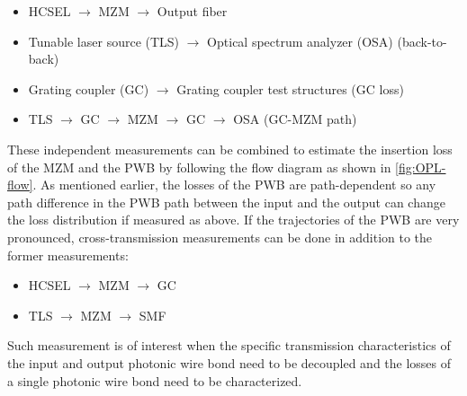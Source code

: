 \begin{itemize}
\item HCSEL $\rightarrow$ MZM $\rightarrow$ Output fiber
\item Tunable laser source (TLS) $\rightarrow$ Optical spectrum analyzer (OSA) (back-to-back)
\item Grating coupler (GC) $\rightarrow$ Grating coupler test structures (GC loss)
\item TLS $\rightarrow$ GC $\rightarrow$ MZM $\rightarrow$ GC $\rightarrow$ OSA (GC-MZM path)
\end{itemize}

These independent measurements can be combined to estimate the insertion loss of the MZM and the PWB by following the flow diagram as shown in \ref{fig:OPL-flow}. As mentioned earlier, the losses of the PWB are path-dependent so any path difference in the PWB path between the input and the output can change the loss distribution if measured as above. If the trajectories of the PWB are very pronounced, cross-transmission measurements can be done in addition to the former measurements:

\begin{itemize}
\item HCSEL $\rightarrow$ MZM $\rightarrow$ GC
\item TLS $\rightarrow$ MZM $\rightarrow$ SMF
\end{itemize}

Such measurement is of interest when the specific transmission characteristics of the input and output photonic wire bond need to be decoupled and the losses of a single photonic wire bond need to be characterized.